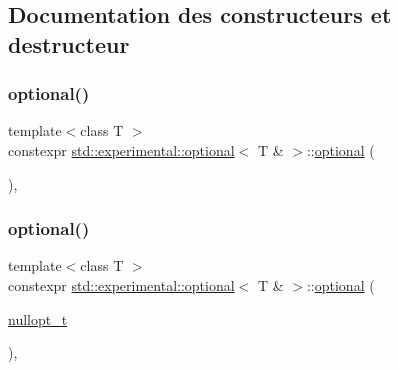 \subsection{Documentation des constructeurs et destructeur}
\mbox{\label{classstd_1_1experimental_1_1optional_3_01_t_01_6_01_4_af1ca4fe03c90cf9cb58e65fde8fd103f}} 
\subsubsection{\texorpdfstring{optional()}{optional()}\hspace{0.1cm}{\footnotesize\ttfamily [1/7]}}
{\footnotesize\ttfamily template$<$class T $>$ \\
constexpr \hyperlink{classstd_1_1experimental_1_1optional}{std\+::experimental\+::optional}$<$ T \& $>$\+::\hyperlink{classstd_1_1experimental_1_1optional}{optional} (\begin{DoxyParamCaption}{ }\end{DoxyParamCaption})\hspace{0.3cm}{\ttfamily [inline]}, {\ttfamily [noexcept]}}

\mbox{\label{classstd_1_1experimental_1_1optional_3_01_t_01_6_01_4_a745fea438842ecd75aaf55b508a072ac}} 
\subsubsection{\texorpdfstring{optional()}{optional()}\hspace{0.1cm}{\footnotesize\ttfamily [2/7]}}
{\footnotesize\ttfamily template$<$class T $>$ \\
constexpr \hyperlink{classstd_1_1experimental_1_1optional}{std\+::experimental\+::optional}$<$ T \& $>$\+::\hyperlink{classstd_1_1experimental_1_1optional}{optional} (\begin{DoxyParamCaption}\item[{\hyperlink{structstd_1_1experimental_1_1nullopt__t}{nullopt\+\_\+t}}]{ }\end{DoxyParamCaption})\hspace{0.3cm}{\ttfamily [inline]}, {\ttfamily [noexcept]}}

